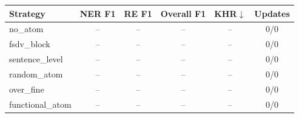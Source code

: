 \begin{tabular}{lccccc}
\toprule
Strategy & NER F1 & RE F1 & Overall F1 & KHR$\downarrow$ & Updates \\
\midrule
no_atom & -- & -- & -- & -- & 0/0 \\
fsdv_block & -- & -- & -- & -- & 0/0 \\
sentence_level & -- & -- & -- & -- & 0/0 \\
random_atom & -- & -- & -- & -- & 0/0 \\
over_fine & -- & -- & -- & -- & 0/0 \\
functional_atom & -- & -- & -- & -- & 0/0 \\
\bottomrule
\end{tabular}
